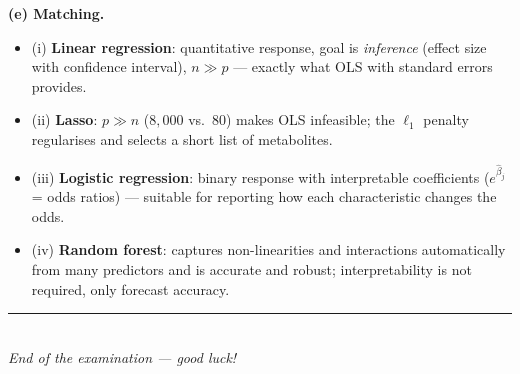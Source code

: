 \documentclass[11pt,a4paper]{article}
\begin{document}
\begin{solutionbox}
\medskip
\textbf{(e) Matching.}
\begin{itemize}[nosep,leftmargin=5mm]
  \item (i) \textbf{Linear regression}: quantitative response, goal is \emph{inference}
    (effect size with confidence interval), $n\gg p$ --- exactly what OLS with standard errors
    provides.
  \item (ii) \textbf{Lasso}: $p\gg n$ ($8{,}000$ vs.\ $80$) makes OLS infeasible; the $\ell_1$
    penalty regularises and selects a short list of metabolites.
  \item (iii) \textbf{Logistic regression}: binary response with interpretable coefficients
    ($e^{\hat\beta_j}$ = odds ratios) --- suitable for reporting how each characteristic changes
    the odds.
  \item (iv) \textbf{Random forest}: captures non-linearities and interactions automatically
    from many predictors and is accurate and robust; interpretability is not required, only
    forecast accuracy.
\end{itemize}
\end{solutionbox}
\fi

\vspace{6mm}
\begin{center}
\rule{0.35\textwidth}{0.4pt}\\[1mm]
\textit{End of the examination --- good luck!}
\end{center}
\end{document}

